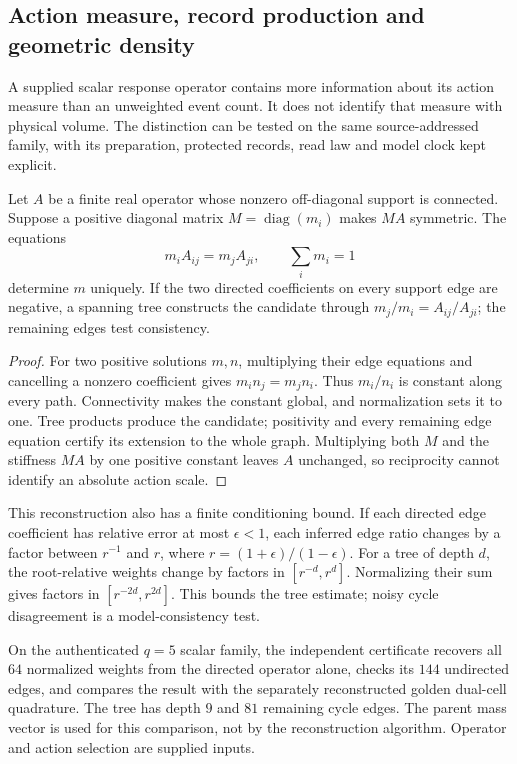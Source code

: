 \subsection{Action measure, record production and geometric density}
\label{sec:source-action-density-identification}

A supplied scalar response operator contains more information about its
action measure than an unweighted event count. It does not identify
that measure with physical volume. The distinction can be tested on the
same source-addressed family, with its preparation, protected records,
read law and model clock kept explicit.

\begin{proposition}
\label{prop:source-action-measure-identification}
Let $A$ be a finite real operator whose nonzero off-diagonal support is
connected. Suppose a positive diagonal matrix $M=\operatorname{diag}(m_i)$
makes $MA$ symmetric. The equations
\[
 m_iA_{ij}=m_jA_{ji},\qquad \sum_i m_i=1
\]
determine $m$ uniquely. If the two directed coefficients on every support
edge are negative, a spanning tree constructs the candidate through
$m_j/m_i=A_{ij}/A_{ji}$; the remaining edges test consistency.
\end{proposition}
\begin{proof}
For two positive solutions $m,n$, multiplying their edge equations and
cancelling a nonzero coefficient gives $m_i n_j=m_j n_i$. Thus $m_i/n_i$
is constant along every path. Connectivity makes the constant global,
and normalization sets it to one. Tree products produce the candidate;
positivity and every remaining edge equation certify its extension to
the whole graph. Multiplying both $M$ and the stiffness $MA$ by one
positive constant leaves $A$ unchanged, so reciprocity cannot identify
an absolute action scale.
\end{proof}

This reconstruction also has a finite conditioning bound. If each
directed edge coefficient has relative error at most $\epsilon<1$,
each inferred edge ratio changes by a factor between $r^{-1}$ and $r$,
where $r=(1+\epsilon)/(1-\epsilon)$. For a tree of depth $d$, the
root-relative weights change by factors in $[r^{-d},r^d]$. Normalizing
their sum gives factors in $[r^{-2d},r^{2d}]$. This bounds the tree
estimate; noisy cycle disagreement is a model-consistency test.

On the authenticated $q=5$ scalar family, the independent certificate
recovers all $64$ normalized weights from the directed operator alone,
checks its $144$ undirected edges, and compares the result with the
separately reconstructed golden dual-cell quadrature. The tree has depth
$9$ and $81$ remaining cycle edges. The parent mass vector is used for
this comparison, not by the reconstruction algorithm. Operator and
action selection are supplied inputs.

